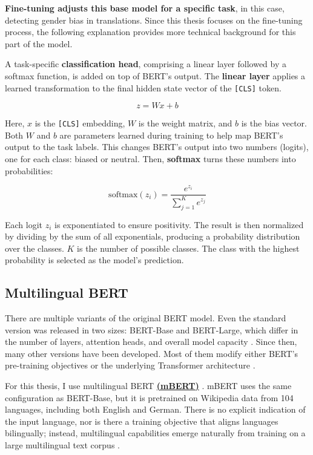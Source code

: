 \textbf{Fine-tuning adjusts this base model for a specific task}, in this case, detecting gender bias in translations. Since this thesis focuses on the fine-tuning process, the following explanation provides more technical background for this part of the model. 

A task-specific \textbf{classification head}, comprising a linear layer followed by a softmax function, is added on top of BERT’s output. The \textbf{linear layer} applies a learned transformation to the final hidden state vector of the \texttt{[CLS]} token. 

\[
z = Wx + b
\]

Here, \(x\) is the \texttt{[CLS]} embedding, \(W\) is the weight matrix, and \(b\) is the bias vector. Both \(W\) and \(b\) are parameters learned during training to help map BERT’s output to the task labels. This changes BERT’s output into two numbers (logits), one for each class: biased or neutral. Then, \textbf{softmax} turns these numbers into probabilities:

\[
\text{softmax}(z_i) = \frac{e^{z_i}}{\sum_{j=1}^{K} e^{z_j}}
\]

Each logit \( z_i \) is exponentiated to ensure positivity. The result is then normalized by dividing by the sum of all exponentials, producing a probability distribution over the classes. \( K \) is the number of possible classes. The class with the highest probability is selected as the model’s prediction.

\subsection{Multilingual BERT}
    There are multiple variants of the original BERT model. Even the standard version was released in two sizes: BERT-Base and BERT-Large, which differ in the number of layers, attention heads, and overall model capacity \citep{devlinBERTPretrainingDeep2019}. Since then, many other versions have been developed. Most of them modify either BERT’s pre-training objectives or the underlying Transformer architecture \citep{libovickyHowLanguageNeutralMultilingual2019}.

    For this thesis, I use multilingual BERT \textbf{\href{https://huggingface.co/google-bert/bert-base-multilingual-cased}{(mBERT)}} \citep{devlinBERTPretrainingDeep2019}. mBERT uses the same configuration as BERT-Base, but it is pretrained on Wikipedia data from 104 languages, including both English and German. There is no explicit indication of the input language, nor is there a training objective that aligns languages bilingually; instead, multilingual capabilities emerge naturally from training on a large multilingual text corpus \citep{piresHowMultilingualMultilingual2019}.

